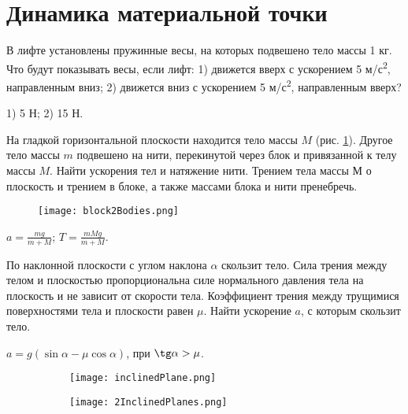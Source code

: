\section{Динамика материальной точки}

\introProblems

\begin{ex} %
В лифте установлены пружинные весы, на которых подвешено тело массы 1 кг. Что будут показывать весы, если лифт: 1) движется вверх с ускорением 5 м/с\textsuperscript{2}, направленным вниз; 2) движется вниз с ускорением 5 м/с\textsuperscript{2}, направленным вверх?
\begin{ans}
1) 5 Н; 2) 15 Н.
\end{ans}
\end{ex}

\begin{ex} %
На гладкой горизонтальной плоскости находится тело массы $M$ (рис. \ref{block2Bodies}). Другое тело массы $m$ подвешено на нити, перекинутой через блок и привязанной к телу массы $M$. Найти ускорения тел и натяжение нити. Трением тела массы $М$ о плоскость и трением в блоке, а также массами блока и нити пренебречь.

\begin{figure}[h]
\centering
\texttt{[image: block2Bodies.png]}
\caption{}
\label{block2Bodies}
\end{figure}

\begin{ans}
$a = \frac{mg}{m+M}$; $T = \frac{mMg}{m+M}$.
\end{ans}
\end{ex}

\begin{ex} %
По наклонной плоскости с углом наклона $\alpha$ скользит тело. Сила трения между телом и плоскостью пропорциональна силе нормального давления тела на плоскость и не зависит от скорости тела. Коэффициент трения между трущимися поверхностями тела и плоскости равен $\mu$. Найти ускорение $a$, с которым скользит тело.
\begin{ans}
$a = g (\sin \alpha - \mu \cos \alpha)$, при $\tg \alpha > \mu$.
\end{ans}
\end{ex}

\begin{figure}[h]
\centering
\begin{subfigure}{.43\textwidth}
  \centering
  \texttt{[image: inclinedPlane.png]}
  \caption{}
  \label{inclinedPlane}
\end{subfigure}%
\begin{subfigure}{.57\textwidth}
  \centering
  \texttt{[image: 2InclinedPlanes.png]}
  \caption{}
  \label{2InclinedPlanes}
\end{subfigure}
\caption{}
\end{figure}

